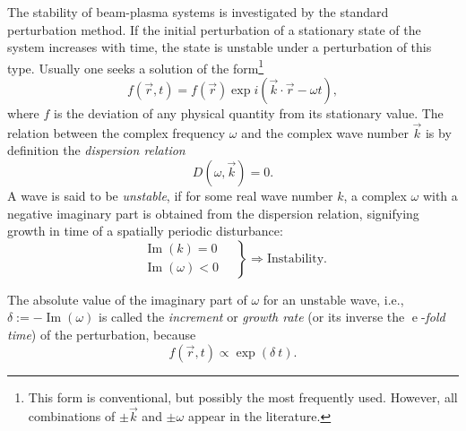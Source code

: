 \documentclass [12pt,a4paper,     ]{report} %
\newcommand{\DEF}{:=}                 %
\newcommand{\IMA}{\operatorname{Im}}  %
\newcommand{\e  }{\operatorname{e}}   %
\begin{document}
	The stability of beam-plasma systems is investigated by the standard perturbation method.  If the initial perturbation of a stationary state of the system increases with time, the state is unstable under a perturbation of this type.  Usually one seeks a solution of the form\footnote{This form is conventional, but possibly the most frequently used.  However, all combinations of $\pm \vec{k}$ and $\pm \omega$ appear in the literature.}
%
\begin{equation}\label{sta:1} %
     f(\vec{r},t) = f(\vec{r}) \exp i(\vec{k}\cdot\vec{r} - \omega t),
\end{equation}
%
where $f$ is the deviation of any physical quantity from its stationary value.  The relation between the complex frequency $\omega$ and the complex wave number $\vec{k}$ is by definition the \emph{dispersion relation}
%
\begin{equation}\label{sta:2} %
                              D(\omega,\vec{k}) = 0.
\end{equation}
%
A wave is said to be \emph{unstable}, if for some real wave number $k$, a complex $\omega$ with a negative imaginary part is obtained from the dispersion relation, signifying growth in time of a spatially periodic disturbance:
%
\begin{equation}\label{sta:3} %
\left.
\begin{array}{c}
\IMA(k)      = 0 \\
\IMA(\omega) < 0
\end{array}
\quad \right\} \Longrightarrow \text{Instability}.
\end{equation}
%

%
The absolute value of the imaginary part of $\omega$ for an unstable wave, i.e., $\delta \DEF - \IMA(\omega)$ is called the \emph{increment} or \emph{growth rate} (or its inverse the $\e$-\emph{fold time}) of the perturbation, because
%
\begin{equation}\label{sta:4} %
         f(\vec{r},t)   \propto \exp (\delta~t).
\end{equation}
%
\end{document}
